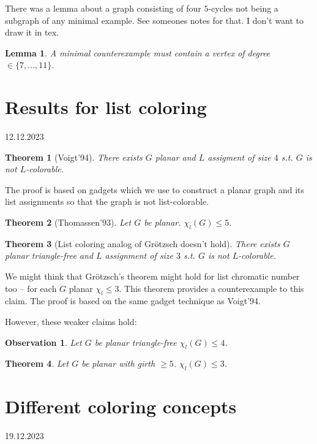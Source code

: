 \documentclass{article}
\newtheorem*{theorem}{Theorem}
\newtheorem*{lemma}{Lemma}
\newtheorem*{observation}{Observation}
\begin{document}
\noindent
There was a lemma about a graph consisting of four $5$-cycles not being a
subgraph of any minimal example. See someones notes for that. I don't want to
draw it in tex.

\begin{lemma}
	A minimal counterexample must contain a vertex of degree $\in \{7, ...,
	11\}$.
\end{lemma}


\newpage
\section{Results for list coloring} %
12.12.2023

\begin{theorem}[Voigt'94]
	There exists $G$ planar and $L$ assigment of size $4$ s.t. $G$ is
	not $L$-colorable.
\end{theorem}

\noindent
The proof is based on gadgets which we use to construct a planar graph and its
list assignments so that the graph is not list-colorable.

\begin{theorem}[Thomassen'93]
	Let $G$ be planar. $\chi_l(G) \le 5$.
\end{theorem}

\begin{theorem}[List coloring analog of Grötzsch doesn't hold]
	There exists $G$ planar triangle-free and $L$ assignment of size $3$
	s.t. $G$ is not $L$-colorable.
\end{theorem}

\noindent
We might think that Grötzsch's theorem might hold for list chromatic number
too -- for each $G$ planar $\chi_l \le 3$. This theorem provides a
counterexample to this claim. The proof is based on the same gadget technique
as Voigt'94.

However, these weaker claims hold:

\begin{observation}
	Let $G$ be planar triangle-free $\chi_l(G) \le 4$.
\end{observation}

\begin{theorem}
	Let $G$ be planar with girth $\ge 5$. $\chi_l(G) \le 3$.
\end{theorem}


\newpage
\section{Different coloring concepts} %
19.12.2023
\end{document}

